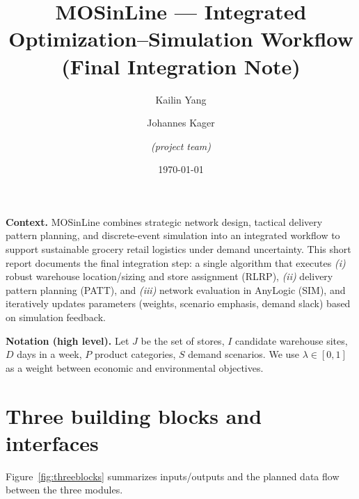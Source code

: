 \documentclass[11pt,a4paper]{article}
\title{\vspace{-1.2em}MOSinLine --- Integrated Optimization--Simulation Workflow (Final Integration Note)}
\author{Kailin Yang \and Johannes Kager \and  \textit{(project team)}}
\date{\vspace{-0.8em}\today}
\begin{document}
\maketitle

\noindent\textbf{Context.}
MOSinLine combines strategic network design, tactical delivery pattern planning, and discrete-event simulation
into an integrated workflow to support sustainable grocery retail logistics under demand uncertainty.
This short report documents the final integration step: a single algorithm that executes
\emph{(i)} robust warehouse location/sizing and store assignment (RLRP),
\emph{(ii)} delivery pattern planning (PATT),
and \emph{(iii)} network evaluation in AnyLogic (SIM),
and iteratively updates parameters (weights, scenario emphasis, demand slack) based on simulation feedback.\par

\vspace{0.8em}
\noindent\textbf{Notation (high level).}
Let $J$ be the set of stores, $I$ candidate warehouse sites, $D$ days in a week, $P$ product categories, $S$ demand scenarios.
We use $\lambda\in[0,1]$ as a weight between economic and environmental objectives.

\section{Three building blocks and interfaces}

Figure~\ref{fig:threeblocks} summarizes inputs/outputs and the planned data flow between the three modules.
\end{document}
